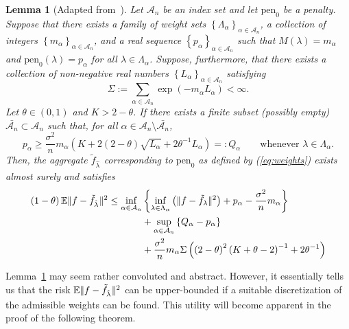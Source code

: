 \documentclass[11pt, letter paper]{article}
\newcommand{\1}{\mathmybb{1}}
\newtheorem{lemma}[proposition]{Lemma}
\newcommand{\0}{\emptyset}
\newcommand{\E}{\mathbb{E}}
\newcommand{\paren}[1]{\left(#1 \right)}
\newcommand{\set}[1]{\left\{ #1 \right\}}
\newcommand{\norm}[1]{|\hspace{-1pt}|#1 |\hspace{-1pt}|}
\newcommand{\normsq}[1]{\norm{#1}^{2}}
\newcommand{\Acal}{\mathcal{A}_{n}}
\newcommand{\ftilde}[1]{\tilde{f}_{#1}}
\newcommand{\lambdahat}[1]{\hat{\lambda}_{#1}}
\begin{document}
\begin{lemma}[Adapted from~\textcite{BirgeMassart2001}]\label{lemm:birge}
    Let \(\Acal\) be an index set and let \(\mathrm{pen}_{0}\) be a penalty. Suppose that there exists a family of weight sets \(\set{\Lambda_{\alpha}}_{\alpha\in\Acal}\), a collection of integers \(\set{m_{\alpha}}_{\alpha\in\Acal}\), and a real sequence \(\set{p_{\alpha}}_{\alpha\in\Acal}\) such that \(M(\lambda) = m_{\alpha}\) and \(\mathrm{pen}_{0}(\lambda) = p_{\alpha}\) for all \(\lambda\in\Lambda_{\alpha}\). Suppose, furthermore, that there exists a collection of non-negative real numbers \(\set{L_{\alpha}}_{\alpha\in\Acal}\) satisfying 
    \begin{equation}\label{eq:conditionbirge1}
        \Sigma:=\sum_{\alpha\in\Acal}\exp\paren{-m_{\alpha}L_{\alpha}}<\infty.
    \end{equation}
    Let \(\theta\in(0,1)\) and \(K>2-\theta\). If there exists a finite subset (possibly empty) \(\bar{\Acal}\subset\Acal\) such that, for all \(\alpha\in\Acal\setminus\bar{\Acal}\), 
    \begin{equation}\label{eq:conditionbirge2}
        p_{\alpha} \geq \frac{\sigma^2}{n}m_{\alpha}\paren{K + 2(2-\theta)\sqrt{L_{\alpha}} +2{\theta^{-1}}L_{\alpha}} =: Q_{\alpha}\qquad\text{whenever }\lambda\in\Lambda_{\alpha}.
    \end{equation}
        Then, the aggregate \(\ftilde{\lambdahat{}}\) corresponding to \(\mathrm{pen}_{0}\) as defined by  (\ref{eq:weights}) exists almost surely and satisfies
    \begin{align}
        \notag\paren{1-\theta}\E{\normsq{f - \ftilde{\lambdahat{}}}} \leq 
        \inf_{\alpha\in\Acal}&\set{\inf_{\lambda\in\Lambda_{\alpha}}\paren{\normsq{f - \ftilde{\lambda}}} + p_{\alpha} - \frac{\sigma^2}{n}m_{\alpha}}\\
        \notag&+ \sup_{\alpha\in\Acal}\set{Q_{\alpha} - p_{\alpha}}\\
        &+ \frac{\sigma^{2}}{n}m_{\alpha}\Sigma \paren{\paren{2-\theta}^{2}\paren{K+\theta-2}^{-1} + 2\theta^{-1}}
    \end{align}

\end{lemma}

Lemma~\ref{lemm:birge} may seem rather convoluted and abstract. However, it essentially tells us that the risk \(\E{\normsq{f - \ftilde{\lambdahat{}}}}\) can be upper-bounded if a suitable discretization of the admissible weights can be found. This utility will become apparent in the proof of the following theorem.
\end{document}

